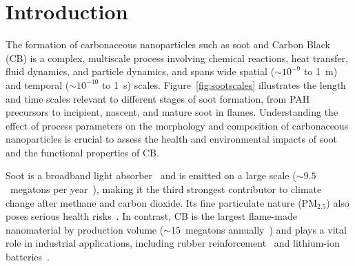 \section{Introduction}
The formation of carbonaceous nanoparticles such as soot and Carbon Black (CB) is a complex, multiscale process involving chemical reactions, heat transfer, fluid dynamics, and particle dynamics, and spans wide spatial ($\sim 10^{-9}$ to 1~m) and temporal ($\sim 10^{-10}$ to 1~s) scales. Figure~\ref{fig:sootscales} illustrates the length and time scales relevant to different stages of soot formation, from PAH precursors to incipient, nascent, and mature soot in flames. Understanding the effect of process parameters on the morphology and composition of carbonaceous nanoparticles is crucial to assess the health and environmental impacts of soot and the functional properties of CB.


Soot is a broadband light absorber~\cite{d2009combustion} and is emitted on a large scale ($\sim 9.5$~megatons per year~\citep{myhre2014anthropogenic}), making it the third strongest contributor to climate change after methane and carbon dioxide. Its fine particulate nature ($\mathrm{PM_{2.5}}$) also poses serious health risks~\citep{borm2004inhaled}. In contrast, CB is the largest flame-made nanomaterial by production volume ($\sim15$~megatons annually~\citep{rosner2024techno}) and plays a vital role in industrial applications, including rubber reinforcement~\citep{international2016carbon} and lithium-ion batteries~\citep{Palomares2010}.




